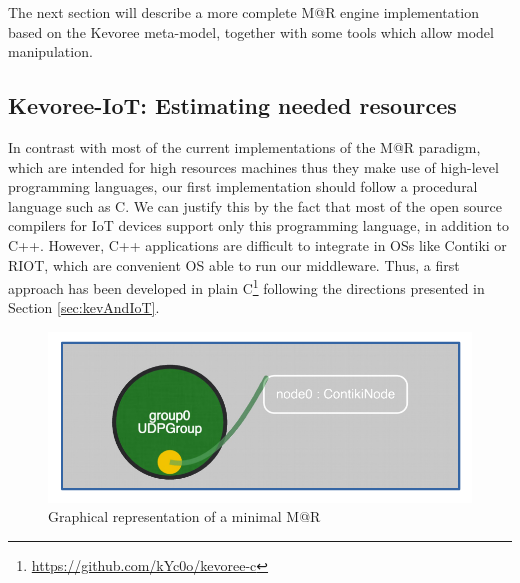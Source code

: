 The next section will describe a more complete M@R engine implementation based on the Kevoree meta-model, together with some tools which allow model manipulation.

\subsection{Kevoree-IoT: Estimating needed resources}
\label{subsec:MARImpl}
In contrast with most of the current implementations of the M@R paradigm, which are intended for high resources machines thus they make use of high-level programming languages, our first implementation should follow a procedural language such as C.
We can justify this by the fact that most of the open source compilers for IoT devices support only this programming language, in addition to C++.
However, C++ applications are difficult to integrate in OSs like Contiki or RIOT, which are convenient OS able to run our middleware.
Thus, a first approach has been developed in plain C\footnote{\url{https://github.com/kYc0o/kevoree-c}} following the directions presented in Section \ref{sec:kevAndIoT}.


\begin{figure}[]
	\centering
	\includegraphics[width=0.55\columnwidth]{chapters/modelsAtRuntimeContiki.images/MAR_example.pdf}
	\caption{Graphical representation of a minimal M@R}
	\label{fig:1stModelC}
\end{figure}

